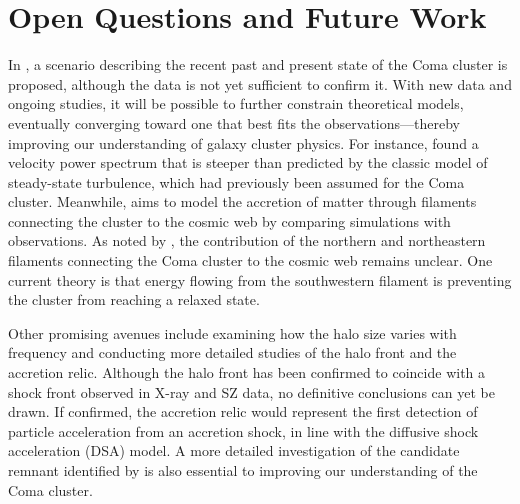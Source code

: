 \documentclass[11pt,letterpaper]{article}
\begin{document}
\section{Open Questions and Future Work} \label{sec:why_more}
In \cite{bonafede_coma_2022-1}, a scenario describing the recent past and present state of the Coma cluster is proposed, although the data is not yet sufficient to confirm it. With new data and ongoing studies, it will be possible to further constrain theoretical models, eventually converging toward one that best fits the observations—thereby improving our understanding of galaxy cluster physics. For instance, \cite{xrism_collaboration_xrism_2025} found a velocity power spectrum that is steeper than predicted by the classic model of steady-state turbulence, which had previously been assumed for the Coma cluster. Meanwhile, \cite{malavasi_cosmic_2023} aims to model the accretion of matter through filaments connecting the cluster to the cosmic web by comparing simulations with observations. As noted by \cite{mirakhor_complete_2020}, the contribution of the northern and northeastern filaments connecting the Coma cluster to the cosmic web remains unclear. One current theory is that energy flowing from the southwestern filament is preventing the cluster from reaching a relaxed state.

\medskip
\par Other promising avenues include examining how the halo size varies with frequency and conducting more detailed studies of the halo front and the accretion relic. Although the halo front has been confirmed to coincide with a shock front observed in X-ray and SZ data, no definitive conclusions can yet be drawn. If confirmed, the accretion relic would represent the first detection of particle acceleration from an accretion shock, in line with the diffusive shock acceleration (DSA) model. A more detailed investigation of the candidate remnant identified by \cite{bonafede_coma_2022-1} is also essential to improving our understanding of the Coma cluster.

\newpage

\printbibliography
\end{document}
